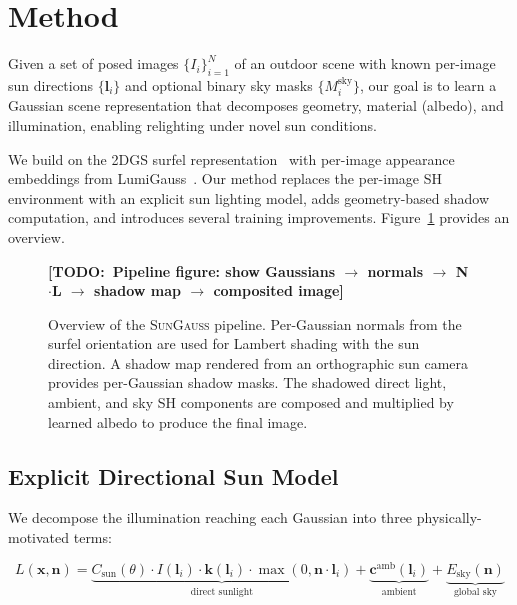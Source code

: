\documentclass[conference]{IEEEtran}
\newcommand{\todo}[1]{{\color{red}\textbf{[TODO:~#1]}}}
\newcommand{\ours}{\textsc{SunGauss}}
\begin{document}
\section{Method}
\label{sec:method}

Given a set of posed images $\{I_i\}_{i=1}^{N}$ of an outdoor scene with known per-image sun directions $\{\mathbf{l}_i\}$ and optional binary sky masks $\{M_i^{\text{sky}}\}$, our goal is to learn a Gaussian scene representation that decomposes geometry, material (albedo), and illumination, enabling relighting under novel sun conditions.

We build on the 2DGS surfel representation~\cite{huang20242dgs} with per-image appearance embeddings from LumiGauss~\cite{joaxkal2024lumigauss}.
Our method replaces the per-image SH environment with an explicit sun lighting model, adds geometry-based shadow computation, and introduces several training improvements.
Figure~\ref{fig:pipeline} provides an overview.

\begin{figure}[t]
    \centering
    \todo{Pipeline figure: show Gaussians $\rightarrow$ normals $\rightarrow$ N$\cdot$L $\rightarrow$ shadow map $\rightarrow$ composited image}
    \caption{Overview of the \ours{} pipeline. Per-Gaussian normals from the surfel orientation are used for Lambert shading with the sun direction. A shadow map rendered from an orthographic sun camera provides per-Gaussian shadow masks. The shadowed direct light, ambient, and sky SH components are composed and multiplied by learned albedo to produce the final image.}
    \label{fig:pipeline}
\end{figure}

\subsection{Explicit Directional Sun Model}
\label{sec:sun_model}

We decompose the illumination reaching each Gaussian into three physically-motivated terms:

\begin{equation}
    L(\mathbf{x}, \mathbf{n}) = \underbrace{C_{\text{sun}}(\theta) \cdot I(\mathbf{l}_i) \cdot \mathbf{k}(\mathbf{l}_i) \cdot \max(0, \mathbf{n} \cdot \mathbf{l}_i)}_{\text{direct sunlight}} + \underbrace{\mathbf{c}^{\text{amb}}(\mathbf{l}_i)}_{\text{ambient}} + \underbrace{E_{\text{sky}}(\mathbf{n})}_{\text{global sky}}
    \label{eq:lighting}
\end{equation}
\end{document}
